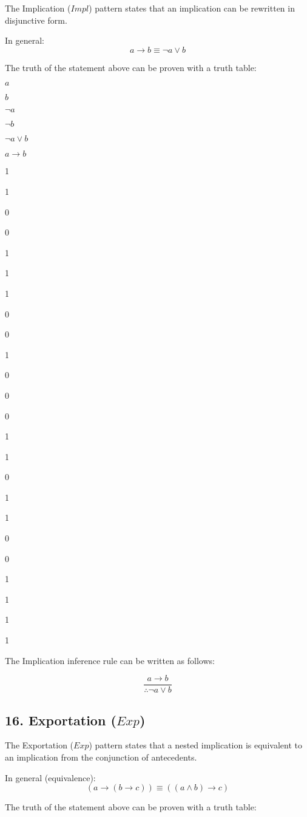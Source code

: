 The Implication (\(Impl\)) pattern states that an implication can be
rewritten in disjunctive form.

In general:\\
\[a \rightarrow b \equiv \lnot a \lor b\]

The truth of the statement above can be proven with a truth table:

\(a\)

\(b\)

\(\neg a\)

\(\neg b\)

\(\neg a \lor b\)

\(a \rightarrow b\)

1

1

0

0

1

1

1

0

0

1

0

0

0

1

1

0

1

1

0

0

1

1

1

1

The Implication inference rule can be written as follows:

\[
\frac{a \rightarrow b}{\therefore \lnot a \lor b}
\]

\subsection{\texorpdfstring{16. Exportation
(\(Exp\))}{16. Exportation (Exp)}}\label{exportation-exp}

The Exportation (\(Exp\)) pattern states that a nested implication is
equivalent to an implication from the conjunction of antecedents.

In general (equivalence):
\[(a \rightarrow (b \rightarrow c)) \equiv ((a \land b) \rightarrow c)\]

The truth of the statement above can be proven with a truth table:

